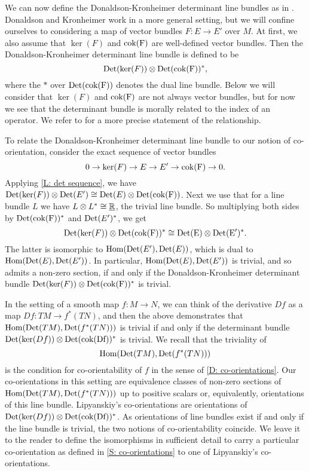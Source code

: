 We can now define the Donaldson-Kronheimer determinant line bundles as in \cite[Section 5.2.1]{DoKr90}.
Donaldson and Kronheimer work in a more general setting, but we will confine ourselves to considering a map of vector bundles $F \colon E \to E'$ over $M$.
At first, we also assume that $\ker(F)$ and $\rm cok(F)$ are well-defined vector bundles.
Then the Donaldson-Kronheimer determinant line bundle is defined to be
$${\rm Det}(\ker(F)) \otimes {\rm Det}(\rm cok(F))^*,$$
where the $*$ over ${\rm Det}(\rm cok(F))$ denotes the dual line bundle.
Below we will consider that $\ker(F)$ and $\rm cok(F)$ are not always vector bundles, but for now we see that the determinant bundle is morally related to the index of an operator.
We refer to \cite[Section 5.2.1]{DoKr90} for a more precise statement of the relationship.

To relate the Donaldson-Kronheimer determinant line bundle to our notion of co-orientation, consider the exact sequence of vector bundles
\begin{equation*}
	0 \to \ker(F) \to E \to E' \to \rm cok(F) \to 0.
\end{equation*}
Applying \cref{L: det sequence}, we have ${\rm Det}(\ker(F)) \otimes {\rm Det}(E') \cong {\rm Det}(E) \otimes {\rm Det}(\rm cok(F))$.
Next we use that for a line bundle $L$ we have $L \otimes L^* \cong \underline{\mathbb{R}}$, the trivial line bundle.
So multiplying both sides by ${\rm Det}(\rm cok(F))^*$ and ${\rm Det}(E')^*$, we get
$${\rm Det}(\ker(F)) \otimes {\rm Det}(\rm cok(F))^* \cong {\rm Det}(E) \otimes {\rm Det}(E')^*.$$
The latter is isomorphic to $\textup{Hom}({\rm Det}(E'), {\rm Det}(E))$, which is dual to $\textup{Hom}({\rm Det}(E), {\rm Det}(E'))$.
In particular, $\textup{Hom}({\rm Det}(E), {\rm Det}(E'))$ is trivial, and so admits a non-zero section, if and only if the Donaldson-Kronheimer determinant bundle ${\rm Det}(\ker(F)) \otimes {\rm Det}(\rm cok(F))^*$ is trivial.

In the setting of a smooth map $f \colon M \to N$, we can think of the derivative $Df$ as a map $Df \colon TM \to f^*(TN)$, and then the above demonstrates that $\textup{Hom}({\rm Det}(TM), {\rm Det}(f^*(TN)))$ is trivial if and only if the determinant bundle ${\rm Det}(\ker(Df)) \otimes {\rm Det}(\rm cok(Df))^*$ is trivial.
We recall that the triviality of
\[
\textup{Hom}({\rm Det}(TM), {\rm Det}(f^*(TN)))
\]
is the condition for co-orientability of $f$ in the sense of \cref{D: co-orientations}.
Our co-orientations in this setting are equivalence classes of non-zero sections of $\textup{Hom}({\rm Det}(TM), {\rm Det}(f^*(TN)))$ up to positive scalars or, equivalently, orientations of this line bundle.
Lipyanskiy's co-orientations are orientations of ${\rm Det}(\ker(Df)) \otimes {\rm Det}(\rm cok(Df))^*$.
As orientations of line bundles exist if and only if the line bundle is trivial, the two notions of co-orientability coincide.
We leave it to the reader to define the isomorphisms in sufficient detail to carry a particular co-orientation as defined in \cref{S: co-orientations} to one of Lipyanskiy's co-orientations.

